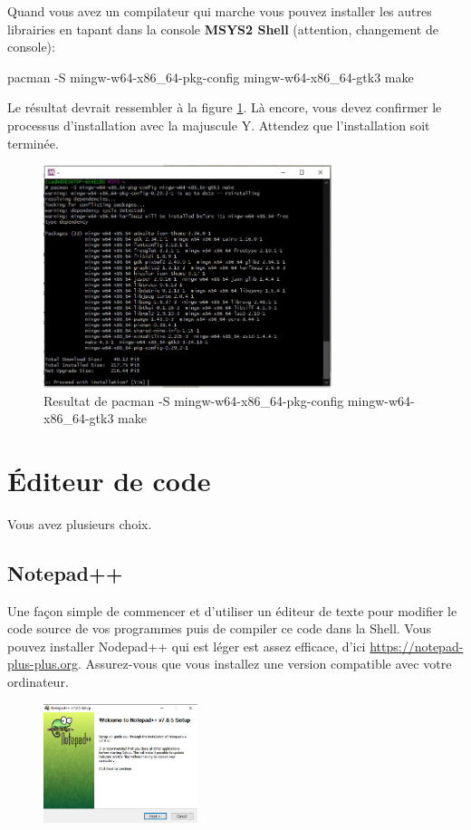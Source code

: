 \documentclass{article}
\begin{document}
Quand vous avez un compilateur qui marche vous pouvez installer les autres librairies en tapant dans la console {\color{Purple}\textbf{MSYS2 Shell}} (attention, changement de console):
\begin{tcolorbox}[width=\textwidth,colframe=Purple,colback={black},title={Ceci est la console MSYS2 Shell},outer arc=0mm,colupper=white]    
      pacman -S mingw-w64-x86\_64-pkg-config mingw-w64-x86\_64-gtk3 make
\end{tcolorbox}
Le résultat devrait ressembler à la figure \ref{F:gtkInstal}. Là encore, vous devez confirmer le processus d'installation avec la majuscule Y. Attendez que l'installation soit terminée.
\begin{figure}[H]
\center
\includegraphics[width=0.75\textwidth]{Plots/Msys2_14pkg.jpg}
\caption{Resultat de pacman -S mingw-w64-x86\_64-pkg-config mingw-w64-x86\_64-gtk3 make\label{F:gtkInstal}}
\end{figure}

\section{Éditeur de code\label{S:Editor}}
Vous avez plusieurs choix.
\subsection{Notepad++}
Une façon simple de commencer et d’utiliser un éditeur de texte pour modifier le code source de vos programmes puis de compiler ce code dans la Shell. Vous pouvez installer Nodepad++ qui est léger est assez efficace, d'ici \href{https://notepad-plus-plus.org}{https://notepad-plus-plus.org}. Assurez-vous que vous installez une version compatible avec votre ordinateur.
\begin{figure}[H]
\center
\includegraphics[width=0.4\textwidth]{Plots/Editor_1.jpg}
\end{figure}
\end{document}
